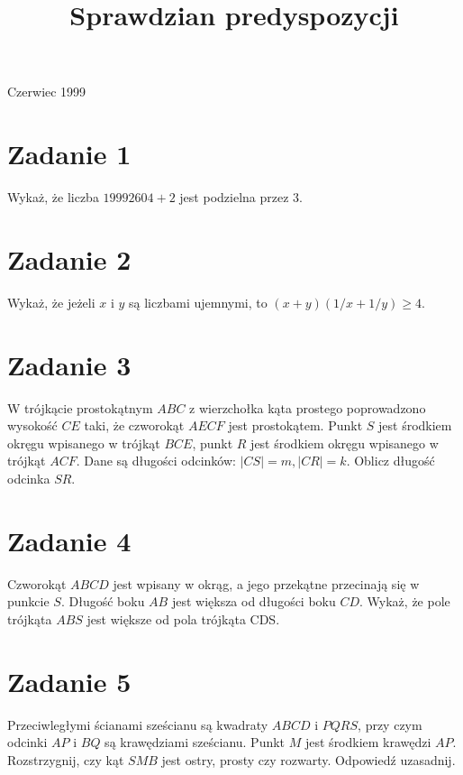 \documentclass[10pt]{article}
\title{Sprawdzian predyspozycji }
\author{}
\date{}
\begin{document}
\maketitle
Czerwiec 1999

\section*{Zadanie 1}
Wykaż, że liczba \(19992604+2\) jest podzielna przez 3.

\section*{Zadanie 2}
Wykaż, że jeżeli \(x\) i \(y\) są liczbami ujemnymi, to \((x+y)(1 / x+1 / y) \geq 4\).

\section*{Zadanie 3}
W trójkącie prostokątnym \(A B C\) z wierzchołka kąta prostego poprowadzono wysokość \(C E\) taki, że czworokąt \(A E C F\) jest prostokątem. Punkt \(S\) jest środkiem okręgu wpisanego w trójkąt \(B C E\), punkt \(R\) jest środkiem okręgu wpisanego w trójkąt \(A C F\). Dane są długości odcinków: \(|C S|=m,|C R|=k\). Oblicz długość odcinka \(S R\).

\section*{Zadanie 4}
Czworokąt \(A B C D\) jest wpisany w okrąg, a jego przekątne przecinają się w punkcie \(S\). Długość boku \(A B\) jest większa od długości boku \(C D\). Wykaż, że pole trójkąta \(A B S\) jest większe od pola trójkąta CDS.

\section*{Zadanie 5}
Przeciwległymi ścianami sześcianu są kwadraty \(A B C D\) i \(P Q R S\), przy czym odcinki \(A P\) i \(B Q\) są krawędziami sześcianu. Punkt \(M\) jest środkiem krawędzi \(A P\). Rozstrzygnij, czy kąt \(S M B\) jest ostry, prosty czy rozwarty. Odpowiedź uzasadnij.
\end{document}
